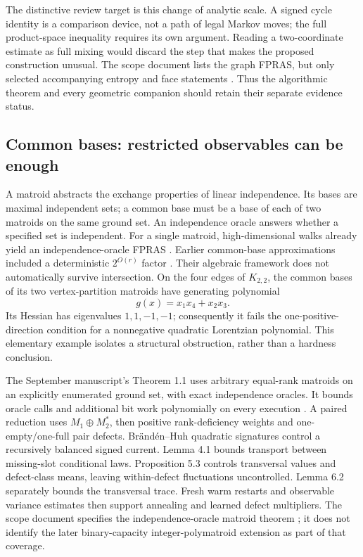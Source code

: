 The distinctive review target is this change of analytic scale. A signed
cycle identity is a comparison device, not a path of legal Markov moves;
the full product-space inequality requires its own argument. Reading a
two-coordinate estimate as full mixing would discard the step that makes
the proposed construction unusual. The scope document lists the graph FPRAS,
but only selected accompanying entropy and face statements
\cite{FrontScope113}. Thus the algorithmic theorem and every geometric companion
should retain their separate evidence status.

\subsection{Common bases: restricted observables can be enough}

A matroid abstracts the exchange properties of linear independence.
Its bases are maximal independent sets; a common base must be a base of
each of two matroids on the same ground set. An independence oracle
answers whether a specified set is independent. For a single matroid,
high-dimensional walks already yield an independence-oracle
FPRAS \cite{FrontALOV2024}. Earlier common-base approximations included a
deterministic \(2^{O(r)}\) factor \cite{FrontAOV2021}. Their algebraic framework
does not automatically survive intersection. On the four edges of \(K_{2,2}\),
the common bases of its two vertex-partition matroids have generating
polynomial
\[
g(x)=x_1x_4+x_2x_3.
\]
Its Hessian has eigenvalues \(1,1,-1,-1\); consequently it fails the
one-positive-direction condition for a nonnegative quadratic Lorentzian
polynomial. This elementary example isolates a structural obstruction,
rather than a hardness conclusion.

The September manuscript's Theorem 1.1 uses arbitrary equal-rank matroids
on an explicitly enumerated ground set, with exact independence oracles.
It bounds oracle calls and additional bit work polynomially on every
execution \cite{FrontOpenAICommon}. A paired reduction uses
\(M_1\oplus M_2^*\), then positive rank-deficiency weights and one-empty/one-full
pair defects. Br\"and\'en--Huh quadratic signatures \cite{FrontBH2020} control
a recursively balanced signed current. Lemma 4.1 bounds transport between
missing-slot conditional laws. Proposition 5.3 controls transversal values
and defect-class means, leaving within-defect fluctuations uncontrolled.
Lemma 6.2 separately bounds the transversal trace. Fresh warm restarts and
observable variance estimates then support annealing and learned defect
multipliers. The scope document specifies the independence-oracle matroid
theorem \cite{FrontScope114}; it does not identify the later binary-capacity
integer-polymatroid extension as part of that coverage.

